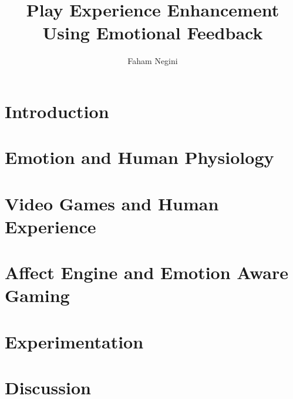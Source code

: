 \documentclass{uofsthesis-cs}
\title{Play Experience Enhancement Using Emotional Feedback}
\author{Faham Negini}
\begin{document}
\maketitle

\frontmatter





\chapter{Introduction}                           \label{chap:intro}       
\chapter{Emotion and Human Physiology}           \label{chap:emotion}     
\chapter{Video Games and Human Experience}       \label{chap:video-games} 
\chapter{Affect Engine and Emotion Aware Gaming} \label{chap:impl}        
\chapter{Experimentation}                        \label{chap:exprm}       
\chapter{Discussion}                             \label{chap:discus}      



\end{document}
